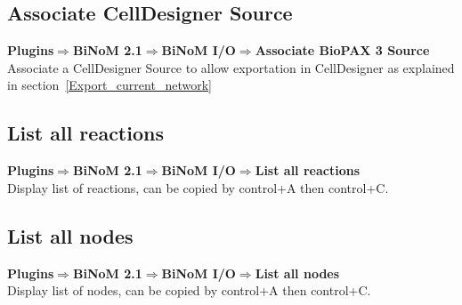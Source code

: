 \subsection{Associate CellDesigner Source}\label{Associate_CellDesigner_Source}
\textbf{Plugins$\Rightarrow$BiNoM 2.1$\Rightarrow$BiNoM I/O$\Rightarrow$Associate BioPAX 3 Source} \\
Associate a CellDesigner Source to allow exportation in CellDesigner as explained in section~\ref{Export_current_network}



\subsection{List all reactions}
\textbf{Plugins$\Rightarrow$BiNoM 2.1$\Rightarrow$BiNoM I/O$\Rightarrow$List all reactions} \\
Display list of reactions, can be copied by control+A then control+C.



\subsection{List all nodes}
\textbf{Plugins$\Rightarrow$BiNoM 2.1$\Rightarrow$BiNoM I/O$\Rightarrow$List all nodes} \\
Display list of nodes, can be copied by control+A then control+C.



